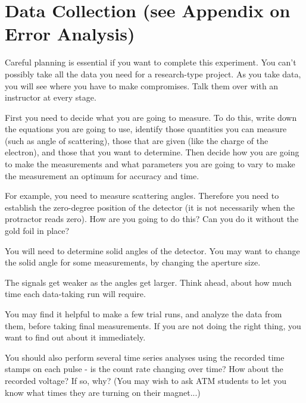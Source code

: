\documentclass{../lab}
\begin{document}
\section{Data Collection (see Appendix on Error Analysis)}


Careful planning is essential if you want to complete this experiment. You can't possibly take all the data you need for a research-type project. As you take data, you will see where you have to make compromises. Talk them over with an instructor at every stage.

First you need to decide what you are going to measure. To do this, write down the equations you are going to use, identify those quantities you can measure (such as angle of scattering), those that are given (like the charge of the electron), and those that you want to determine. Then decide how you are going to make the measurements and what parameters you are going to vary to make the measurement an optimum for accuracy and time.

For example, you need to measure scattering angles. Therefore you need to establish the zero-degree position of the detector (it is not necessarily when the protractor reads zero). How are you going to do this? Can you do it without the gold foil in place?



You will need to determine solid angles of the detector. You may want to change the solid angle for some measurements, by changing the aperture size.

The signals get weaker as the angles get larger. Think ahead, about how much time each data-taking run will require.

You may find it helpful to make a few trial runs, and analyze the data from them, before taking final measurements. If you are not doing the right thing, you want to find out about it immediately.

You should also perform several time series analyses using the recorded time stamps on each pulse - is the count rate changing over time? How about the recorded voltage? If so, why? (You may wish to ask ATM students to let you know what times they are turning on their magnet...)
\end{document}
